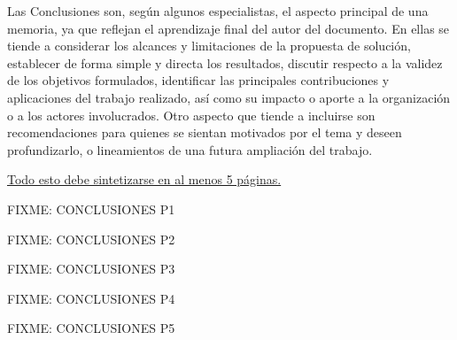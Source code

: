 
Las Conclusiones son, según algunos especialistas, el aspecto principal de una memoria, ya que reflejan el aprendizaje final del autor del documento. En ellas se tiende a considerar los alcances y limitaciones de la propuesta de solución, establecer de forma simple y directa los resultados, discutir respecto a la validez de los objetivos formulados, identificar las principales contribuciones y aplicaciones del trabajo realizado, así como su impacto o aporte a la organización o a los actores involucrados. Otro aspecto que tiende a incluirse son recomendaciones para quienes se sientan motivados por el tema y deseen profundizarlo, o lineamientos de una futura ampliación del trabajo.

\underline{Todo esto debe sintetizarse en al menos 5 páginas.}

FIXME: CONCLUSIONES P1

\newpage
FIXME: CONCLUSIONES P2

\newpage
FIXME: CONCLUSIONES P3

\newpage
FIXME: CONCLUSIONES P4

\newpage
FIXME: CONCLUSIONES P5
